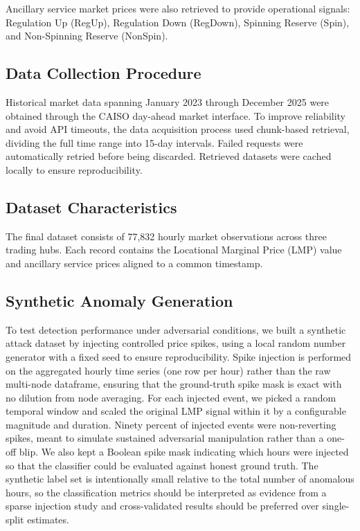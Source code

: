 \documentclass[journal]{IEEEtran}
\begin{document}
Ancillary service market prices were also retrieved to provide operational signals: Regulation Up (RegUp), Regulation Down (RegDown), Spinning Reserve (Spin), and Non-Spinning Reserve (NonSpin).

\subsection{Data Collection Procedure}
Historical market data spanning January 2023 through December 2025 were obtained through the CAISO day-ahead market interface. To improve reliability and avoid API timeouts, the data acquisition process used chunk-based retrieval, dividing the full time range into 15-day intervals. Failed requests were automatically retried before being discarded. Retrieved datasets were cached locally to ensure reproducibility.

\subsection{Dataset Characteristics}
The final dataset consists of 77,832 hourly market observations across three trading hubs. Each record contains the Locational Marginal Price (LMP) value and ancillary service prices aligned to a common timestamp.

\subsection{Synthetic Anomaly Generation}
To test detection performance under adversarial conditions, we built a synthetic attack dataset by injecting controlled price spikes, using a local random number generator with a fixed seed to ensure reproducibility. Spike injection is performed on the aggregated hourly time series (one row per hour) rather than the raw multi-node dataframe, ensuring that the ground-truth spike mask is exact with no dilution from node averaging. For each injected event, we picked a random temporal window and scaled the original LMP signal within it by a configurable magnitude and duration. Ninety percent of injected events were non-reverting spikes, meant to simulate sustained adversarial manipulation rather than a one-off blip. We also kept a Boolean spike mask indicating which hours were injected so that the classifier could be evaluated against honest ground truth. The synthetic label set is intentionally small relative to the total number of anomalous hours, so the classification metrics should be interpreted as evidence from a sparse injection study and cross-validated results should be preferred over single-split estimates.
\end{document}
